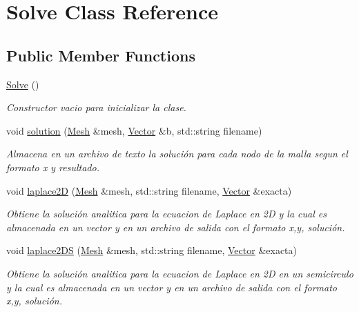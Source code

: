 \hypertarget{class_solve}{}\section{Solve Class Reference}
\label{class_solve}
\subsection*{Public Member Functions}
\begin{DoxyCompactItemize}
\item 
\hypertarget{class_solve_ac437f1307c9d4669205ac7d370a55ffc}{}\label{class_solve_ac437f1307c9d4669205ac7d370a55ffc} 
\hyperlink{class_solve_ac437f1307c9d4669205ac7d370a55ffc}{Solve} ()
\begin{DoxyCompactList}\small\item\em Constructor vacio para inicializar la clase. \end{DoxyCompactList}\item 
void \hyperlink{class_solve_a886704acb9e9ec5bd99741b3923fe469}{solution} (\hyperlink{class_mesh}{Mesh} \&mesh, \hyperlink{class_vector}{Vector} \&b, std\+::string filename)
\begin{DoxyCompactList}\small\item\em Almacena en un archivo de texto la solución para cada nodo de la malla segun el formato x y resultado. \end{DoxyCompactList}\item 
void \hyperlink{class_solve_a9bfcff2b5df48bc1b0fe22ddaa2b8b29}{laplace2D} (\hyperlink{class_mesh}{Mesh} \&mesh, std\+::string filename, \hyperlink{class_vector}{Vector} \&exacta)
\begin{DoxyCompactList}\small\item\em Obtiene la solución analitica para la ecuacion de Laplace en 2D y la cual es almacenada en un vector y en un archivo de salida con el formato x,y, solución. \end{DoxyCompactList}\item 
void \hyperlink{class_solve_a66225d810b2b660ef2206d540973cf02}{laplace2\+DS} (\hyperlink{class_mesh}{Mesh} \&mesh, std\+::string filename, \hyperlink{class_vector}{Vector} \&exacta)
\begin{DoxyCompactList}\small\item\em Obtiene la solución analitica para la ecuacion de Laplace en 2D en un semicirculo y la cual es almacenada en un vector y en un archivo de salida con el formato x,y, solución. \end{DoxyCompactList}\item 

\end{DoxyCompactItemize}
